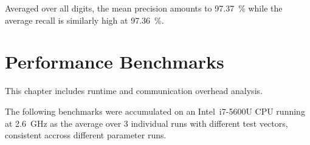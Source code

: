 Averaged over all digits, the mean precision amounts to \SI{97.37}{\percent} while the average recall is similarly high at \SI{97.36}{\percent}.


\section{Performance Benchmarks}
\label{sec:performance-benchmarks}
This chapter includes runtime and communication overhead analysis.

The following benchmarks were accumulated on an Intel\textregistered \, i7-5600U CPU running at \SI{2.6}{\giga\hertz} as the average over 3 individual runs with different test vectors, consistent accross different parameter runs.

